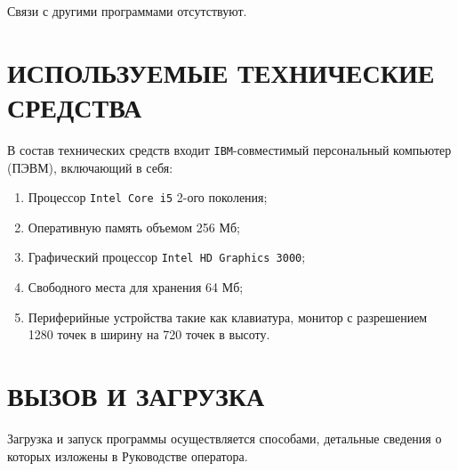 \documentclass[14pt,a4paper,final]{extreport}
\begin{document}
Связи с другими программами отсутствуют.

\chapter{ИСПОЛЬЗУЕМЫЕ ТЕХНИЧЕСКИЕ СРЕДСТВА}

В состав технических средств входит \texttt{IBM}-совместимый персональный компьютер
(ПЭВМ), включающий в себя:
\begin{enumerate}[label=\asbuk*),ref=\asbuk*]
	\item Процессор \texttt{Intel Core i5} 2-ого поколения;
	\item Оперативную память объемом 256 Мб;
	\item Графический процессор \texttt{Intel HD Graphics 3000};
	\item Свободного места для хранения 64 Мб;
	\item Периферийные устройства такие как клавиатура, монитор с разрешением 1280 точек в ширину на 720 точек в высоту.
\end{enumerate}

\chapter{ВЫЗОВ И ЗАГРУЗКА}

Загрузка и запуск программы осуществляется способами, детальные сведения о которых изложены в Руководстве оператора.
\end{document}
